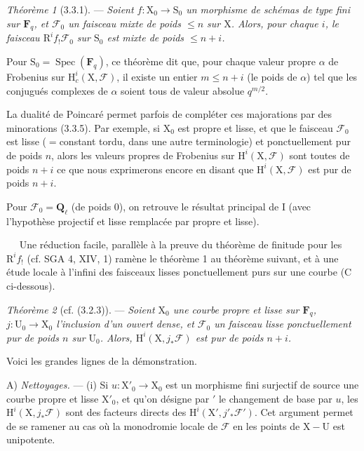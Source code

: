 \documentclass[11pt,leqno]{article}
\newcommand{\Page}[1]{\ifvmode\noindent\else\unskip\ \fi{\footnotesize\textcolor{gray}{[p.\,#1]}}\ \ignorespaces}
\begin{document}
\textit{Théorème 1} (3.3.1). — \textit{Soient \(f:\mathrm{X}_0\to\mathrm{S}_0\) un morphisme de schémas de type fini sur \(\mathbf{F}_q\), et \(\mathscr{F}_0\) un faisceau mixte de poids \(\leq n\) sur \(\mathrm{X}\). Alors, pour chaque \(i\), le faisceau \(\mathrm{R}^i f_!\mathscr{F}_0\) sur \(\mathrm{S}_0\) est mixte de poids \(\leq n+i\).}

Pour \(\mathrm{S}_0=\operatorname{Spec}(\mathbf{F}_q)\), ce théorème dit que, pour chaque valeur propre \(\alpha\) de Frobenius sur \(\mathrm{H}_c^i(\mathrm{X},\mathscr{F})\), il existe un entier \(m\leq n+i\) (le poids de \(\alpha\)) tel que les conjugués complexes de \(\alpha\) soient tous de valeur absolue \(q^{m/2}\).

La dualité de Poincaré permet parfois de compléter ces majorations par des minorations (3.3.5). Par exemple, si \(\mathrm{X}_0\) est propre et lisse, et que le faisceau \(\mathscr{F}_0\) est lisse (\(=\)constant tordu, dans une autre terminologie) et ponctuellement pur de poids \(n\), alors les valeurs propres de Frobenius sur \(\mathrm{H}^i(\mathrm{X},\mathscr{F})\) sont toutes de poids \(n+i\) ce que nous exprimerons encore en disant que \(\mathrm{H}^i(\mathrm{X},\mathscr{F})\) est pur de poids \(n+i\).

Pour \(\mathscr{F}_0=\mathbf{Q}_\ell\) (de poids 0), on retrouve le résultat principal de I (avec l’hypothèse projectif et lisse remplacée par propre et lisse).

\Page{139}
Une réduction facile, parallèle à la preuve du théorème de finitude pour les \(\mathrm{R}^i f_!\) (cf. SGA 4, XIV, 1) ramène le théorème 1 au théorème suivant, et à une étude locale à l’infini des faisceaux lisses ponctuellement purs sur une courbe (C ci-dessous).

\textit{Théorème 2} (cf. (3.2.3)). — \textit{Soient \(\mathrm{X}_0\) une courbe propre et lisse sur \(\mathbf{F}_q\), \(j:\mathrm{U}_0\to\mathrm{X}_0\) l’inclusion d’un ouvert dense, et \(\mathscr{F}_0\) un faisceau lisse ponctuellement pur de poids \(n\) sur \(\mathrm{U}_0\). Alors, \(\mathrm{H}^i(\mathrm{X},j_*\mathscr{F})\) est pur de poids \(n+i\).}

Voici les grandes lignes de la démonstration.

A) \textit{Nettoyages.} — (i) Si \(u:\mathrm{X}'_0\to\mathrm{X}_0\) est un morphisme fini surjectif de source une courbe propre et lisse \(\mathrm{X}'_0\), et qu’on désigne par \({}'\) le changement de base par \(u\), les \(\mathrm{H}^i(\mathrm{X},j_*\mathscr{F})\) sont des facteurs directs des \(\mathrm{H}^i(\mathrm{X}',j'_*\mathscr{F}')\). Cet argument permet de se ramener au cas où la monodromie locale de \(\mathscr{F}\) en les points de \(\mathrm{X}-\mathrm{U}\) est unipotente.
\end{document}
